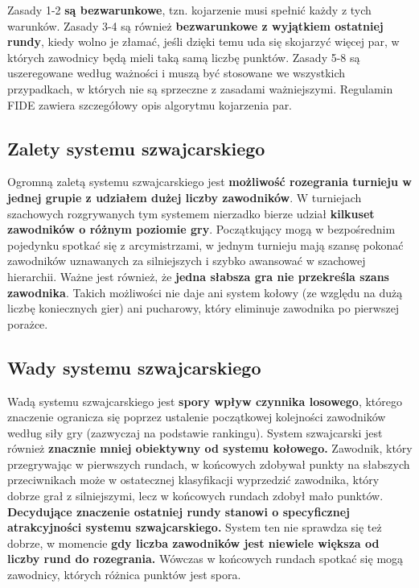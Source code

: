 Zasady 1-2 \textbf{są bezwarunkowe}, tzn. kojarzenie musi spełnić każdy z tych warunków. Zasady 3-4 są również \textbf{bezwarunkowe z wyjątkiem ostatniej rundy}, kiedy wolno je złamać, jeśli dzięki temu uda się skojarzyć więcej par, w których zawodnicy będą mieli taką samą liczbę punktów. Zasady 5-8 są uszeregowane według ważności i muszą być stosowane we wszystkich przypadkach, w których nie są sprzeczne z zasadami ważniejszymi. Regulamin FIDE zawiera szczegółowy opis algorytmu kojarzenia par.

\subsection{Zalety systemu szwajcarskiego}
Ogromną zaletą systemu szwajcarskiego jest \textbf{możliwość rozegrania turnieju w jednej grupie z udziałem dużej liczby zawodników}. W turniejach szachowych rozgrywanych tym systemem nierzadko bierze udział \textbf{kilkuset zawodników o różnym poziomie gry}. Początkujący mogą w bezpośrednim pojedynku spotkać się z arcymistrzami, w jednym turnieju mają szansę pokonać zawodników uznawanych za silniejszych i szybko awansować w szachowej hierarchii. Ważne jest również, że \textbf{jedna słabsza gra nie przekreśla szans zawodnika}. Takich możliwości nie daje ani system kołowy (ze względu na dużą liczbę koniecznych gier) ani pucharowy, który eliminuje zawodnika po pierwszej porażce.

\subsection{Wady systemu szwajcarskiego}
Wadą systemu szwajcarskiego jest \textbf{spory wpływ czynnika losowego}, którego znaczenie ogranicza się poprzez ustalenie początkowej kolejności zawodników według siły gry (zazwyczaj na podstawie rankingu). System szwajcarski jest również \textbf{znacznie mniej obiektywny od systemu kołowego.} Zawodnik, który przegrywając w pierwszych rundach, w końcowych zdobywał punkty na słabszych przeciwnikach może w ostatecznej klasyfikacji wyprzedzić zawodnika, który dobrze grał z silniejszymi, lecz w końcowych rundach zdobył mało punktów. \textbf{Decydujące znaczenie ostatniej rundy stanowi o specyficznej atrakcyjności systemu szwajcarskiego.}
System ten nie sprawdza się też dobrze, w momencie \textbf{gdy liczba zawodników jest niewiele większa od liczby rund do rozegrania.} Wówczas w końcowych rundach spotkać się mogą zawodnicy, których różnica punktów jest spora.



